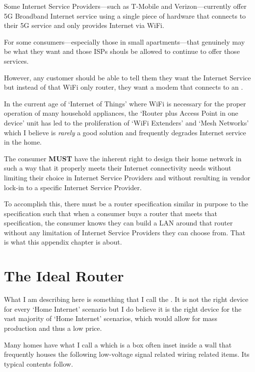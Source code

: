 Some Internet Service Providers---such as T-Mobile and Verizon---currently offer 5G Broadband Internet
service using a single piece of hardware that connects to their 5G service and only provides Internet
via WiFi.

For some consumers---especially those in small apartments---that genuinely may be what they want and
those ISPs shouls be allowed to continue to offer those services.

However, any customer should be able to tell them they want the Internet Service but instead of that
WiFi only router, they want a modem that connects to an .

In the current age of `Internet of Things' where WiFi is necessary for the proper operation of many
household appliances, the `Router plus Access Point in one device' unit has led to the proliferation
of `WiFi Extenders' and `Mesh Networks' which I believe is \emph{rarely} a good solution and frequently
degrades Internet service in the home.

The consumer \textbf{MUST} have the inherent right to design their home network in such a way that
it properly meets their Internet connectivity needs without limiting their choice in Internet Service
Providers and without resulting in vendor lock-in to a specific Internet Service Provider.

To accomplish this, there must be a router specification similar in purpose to the \ngtv{} specification
such that when a consumer buys a router that meets that specification, the consumer knows they can
build a LAN around that router without any limitation of Internet Service Providers they can choose
from. That is what this appendix chapter is about.

\section{The Ideal Router}

What I am describing here is something that I call the . It is not the right device
for every `Home Internet' scenario but I do believe it is the right device for the vast majority of
`Home Internet' scenarios, which would allow for mass production and thus a low price.

Many homes have what I call a \tdefcab{} which is a box often inset inside a wall that frequently houses
the following low-voltage signal related wiring related items. Its typical contents follow.

